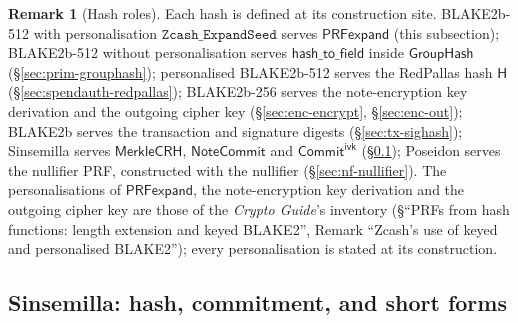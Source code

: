 \documentclass[11pt,a4paper]{article}
\theoremstyle{definition}
\newtheorem{remark}[theorem]{Remark}
\newcommand{\NoteCommit}{\ensuremath{\mathsf{NoteCommit}}}
\newcommand{\CommitIvk}{\ensuremath{\mathsf{Commit}^{\mathsf{ivk}}}}
\newcommand{\GroupHash}{\ensuremath{\mathsf{GroupHash}}}
\begin{document}
\begin{remark}[Hash roles]
Each hash is defined at its construction site. BLAKE2b-512 with
personalisation $\texttt{Zcash\_ExpandSeed}$ serves $\mathsf{PRFexpand}$
(this subsection); BLAKE2b-512 without personalisation serves
$\mathsf{hash\_to\_field}$ inside $\GroupHash$ (\S\ref{sec:prim-grouphash});
personalised BLAKE2b-512 serves the RedPallas hash $\mathsf{H}$
(\S\ref{sec:spendauth-redpallas}); BLAKE2b-256 serves the note-encryption
key derivation and the outgoing cipher key (\S\ref{sec:enc-encrypt},
\S\ref{sec:enc-out}); BLAKE2b serves the transaction and signature digests
(\S\ref{sec:tx-sighash}); Sinsemilla serves $\mathsf{MerkleCRH}$,
$\NoteCommit$ and $\CommitIvk$ (\S\ref{sec:prim-sinsemilla}); Poseidon serves
the nullifier PRF, constructed with the nullifier
(\S\ref{sec:nf-nullifier}). The personalisations of $\mathsf{PRFexpand}$,
the note-encryption key derivation and the outgoing cipher key are those of
the \emph{Crypto Guide}'s inventory (\S``PRFs from hash functions: length
extension and keyed BLAKE2'', Remark ``Zcash's use of keyed and personalised
BLAKE2''); every personalisation is stated at its construction.
\end{remark}

\FloatBarrier
\subsection{Sinsemilla: hash, commitment, and short forms}
\label{sec:prim-sinsemilla}
\end{document}
